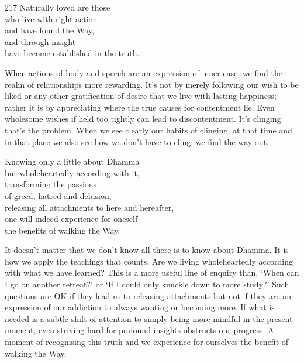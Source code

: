 
\begin{dhpVerse}{217}
\label{dhp-217}
Naturally loved are those\\
who live with right action\\
and have found the Way,\\
and through insight\\
have become established in the truth.
\end{dhpVerse}

\begin{dhpRefl}

When actions of body and speech are an expression of inner ease, we
find the realm of relationships more rewarding. It's not by merely
following our wish to be liked or any other gratification of desire
that we live with lasting happiness; rather it is by appreciating
where the true causes for contentment lie. Even wholesome wishes if
held too tightly can lead to discontentment. It's clinging that's the
problem. When we see clearly our habits of clinging, at that time and
in that place we also see how we don't have to cling; we find the way
out.

\end{dhpRefl}


\begin{dhpVerse}{20}
\label{dhp-20}
Knowing only a little about Dhamma\\
but wholeheartedly according with it,\\
transforming the passions\\
of greed, hatred and delusion,\\
releasing all attachments to here and hereafter,\\
one will indeed experience for oneself\\
the benefits of walking the Way.
\end{dhpVerse}

\begin{dhpRefl}

It doesn't matter that we don't know all there is to know about
Dhamma. It is how we apply the teachings that counts. Are we living
wholeheartedly according with what we have learned? This is a more
useful line of enquiry than, `When can I go on another retreat?' or
`If I could only knuckle down to more study?' Such questions are OK
if they lead us to releasing attachments but not if they are an
expression of our addiction to always wanting or becoming more. If
what is needed is a subtle shift of attention to simply being more
mindful in the present moment, even striving hard for profound
insights obstructs our progress. A moment of recognising this truth
and we experience for ourselves the benefit of walking the Way.

\end{dhpRefl}

